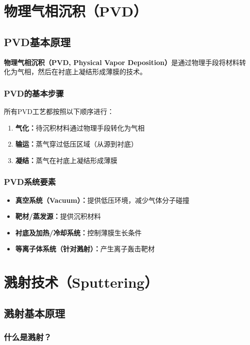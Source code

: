 \documentclass[UTF8,12pt,a4paper]{ctexart}
\begin{document}
\section{物理气相沉积（PVD）}

\subsection{PVD基本原理}

\textbf{物理气相沉积（PVD, Physical Vapor Deposition）}是通过物理手段将材料转化为气相，然后在衬底上凝结形成薄膜的技术。

\subsubsection{PVD的基本步骤}

所有PVD工艺都按照以下顺序进行：

\begin{enumerate}
    \item \textbf{气化：}待沉积材料通过物理手段转化为气相
    \item \textbf{输运：}蒸气穿过低压区域（从源到衬底）
    \item \textbf{凝结：}蒸气在衬底上凝结形成薄膜
\end{enumerate}

\subsubsection{PVD系统要素}

\begin{itemize}
    \item \textbf{真空系统（Vacuum）：}提供低压环境，减少气体分子碰撞
    \item \textbf{靶材/蒸发源：}提供沉积材料
    \item \textbf{衬底及加热/冷却系统：}控制薄膜生长条件
    \item \textbf{等离子体系统（针对溅射）：}产生离子轰击靶材
\end{itemize}

\section{溅射技术（Sputtering）}

\subsection{溅射基本原理}

\subsubsection{什么是溅射？}
\end{document}

